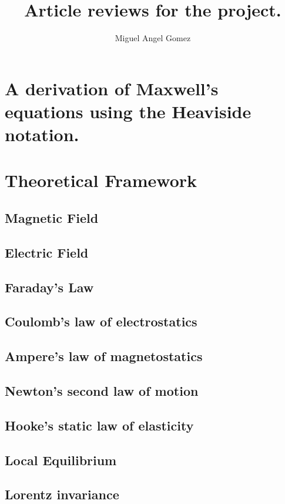 \documentclass{article}
\title{Article reviews for the project.}
\author{Miguel Angel Gomez}
\begin{document}
\maketitle
\newpage
\section{A derivation of Maxwell’s equations using the Heaviside notation.}
\section{Theoretical Framework}
\subsection{Magnetic Field}
\subsection{Electric Field}
\subsection{Faraday’s Law}
\subsection{Coulomb’s law of electrostatics}
\subsection{Ampere’s law of	magnetostatics}
\subsection{Newton’s second law of motion}
\subsection{Hooke’s	static law of elasticity}
\subsection{Local Equilibrium}
\subsection{Lorentz invariance}
\nocite{*}

\end{document}
